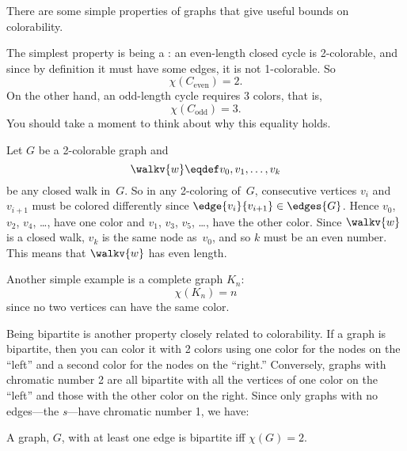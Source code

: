 There are some simple properties of graphs that give useful bounds on
colorability. 
\begin{editingnotes}
\end{editingnotes}
The simplest property is being a : an even-length closed cycle
is 2-colorable, and since by definition it must have some edges, it is not
1-colorable.  So
\[
\chi(C_{\text{even}}) = 2.
\]
On the other hand, an odd-length cycle requires 3 colors, that is,
\begin{equation}\label{Codd3}
\chi(C_{\text{odd}}) = 3.
\end{equation}
You should take a moment to think about why this equality holds.
\begin{editingnotes}

Let $G$ be a 2-colorable graph and
\begin{equation*}
    \walkv{w} \eqdef v_0, v_1, \dots, v_k
\end{equation*}
be any closed walk in~$G$.  So in any 2-coloring of~$G$, consecutive
vertices $v_i$ and $v_{i + 1}$ must be colored differently since
$\edge{v_i}{v_{i + 1}} \in \edges{G}$.  
Hence $v_0$, $v_2$, $v_4$, \dots, have one color and $v_1$, $v_3$,
$v_5$, \dots, have the other color.  Since $\walkv{w}$ is a closed
walk, $v_k$ is the same node as~$v_0$, and so $k$ must be an even
number.  This means that $\walkv{w}$ has even length.
\end{editingnotes}
Another simple example is a complete graph $K_n$:
\[
\chi(K_n) = n
\]
since no two vertices can have the same color.

Being bipartite is another property closely related to colorability.  If a
graph is bipartite, then you can color it with 2 colors using one color
for the nodes on the ``left'' and a second color for the nodes on the
``right.''  Conversely, graphs with chromatic number 2 are all bipartite
with all the vertices of one color on the ``left'' and those with the
other color on the right.  Since only graphs with no edges---the
\emph{s}---have chromatic number 1, we have:  \iffalse
Empty graphs are
bipartite as long they have at least two vertices: a graph with only one
vertex is not bipartite because its vertex set cannot be partitioned into
two \emph{nonempty} subsets.\fi
\begin{lemma}\label{2color-iff-bip}
A graph, $G$, with at least one edge is bipartite iff $\chi(G) = 2$.
\end{lemma}

